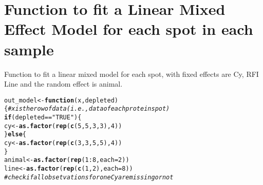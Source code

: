 \documentclass{article}\usepackage[]{graphicx}\usepackage[]{color}
\makeatletter
\newcommand{\hlnum}[1]{\textcolor[rgb]{0.686,0.059,0.569}{#1}}%
\newcommand{\hlstr}[1]{\textcolor[rgb]{0.192,0.494,0.8}{#1}}%
\newcommand{\hlcom}[1]{\textcolor[rgb]{0.678,0.584,0.686}{\textit{#1}}}%
\newcommand{\hlopt}[1]{\textcolor[rgb]{0,0,0}{#1}}%
\newcommand{\hlstd}[1]{\textcolor[rgb]{0.345,0.345,0.345}{#1}}%
\newcommand{\hlkwa}[1]{\textcolor[rgb]{0.161,0.373,0.58}{\textbf{#1}}}%
\newcommand{\hlkwb}[1]{\textcolor[rgb]{0.69,0.353,0.396}{#1}}%
\newcommand{\hlkwc}[1]{\textcolor[rgb]{0.333,0.667,0.333}{#1}}%
\newcommand{\hlkwd}[1]{\textcolor[rgb]{0.737,0.353,0.396}{\textbf{#1}}}%
\newenvironment{kframe}{%
 \def\at@end@of@kframe{}%
 \ifinner\ifhmode%
  \def\at@end@of@kframe{\end{minipage}}%
  \begin{minipage}{\columnwidth}%
 \fi\fi%
 \def\FrameCommand##1{\hskip\@totalleftmargin \hskip-\fboxsep
 \colorbox{shadecolor}{##1}\hskip-\fboxsep
     \hskip-\linewidth \hskip-\@totalleftmargin \hskip\columnwidth}%
 \MakeFramed {\advance\hsize-\width
   \@totalleftmargin\z@ \linewidth\hsize
   \@setminipage}}%
 {\par\unskip\endMakeFramed%
 \at@end@of@kframe}
\newenvironment{knitrout}{}{} %
\makeatother
\begin{document}
\section{Function to fit a Linear Mixed Effect Model for each spot in each sample }
Function to fit a linear mixed model for each spot, with fixed effects are Cy, RFI Line and the random effect is animal.

\begin{knitrout}
\color{fgcolor}\begin{kframe}
\begin{alltt}
\hlstd{out_model} \hlkwb{<-} \hlkwa{function}\hlstd{(}\hlkwc{x}\hlstd{,} \hlkwc{depleted}\hlstd{)\{} \hlcom{# x is the row of data (i.e., data of each protein spot)}
  \hlkwa{if} \hlstd{(depleted} \hlopt{==} \hlstr{"TRUE"}\hlstd{)\{}
    \hlstd{cy} \hlkwb{<-} \hlkwd{as.factor}\hlstd{(}\hlkwd{rep}\hlstd{(}\hlkwd{c}\hlstd{(}\hlnum{5}\hlstd{,}\hlnum{5}\hlstd{,}\hlnum{3}\hlstd{,}\hlnum{3}\hlstd{),}\hlnum{4}\hlstd{))}
  \hlstd{\}} \hlkwa{else} \hlstd{\{}
    \hlstd{cy} \hlkwb{<-} \hlkwd{as.factor}\hlstd{(}\hlkwd{rep}\hlstd{(}\hlkwd{c}\hlstd{(}\hlnum{3}\hlstd{,}\hlnum{3}\hlstd{,}\hlnum{5}\hlstd{,}\hlnum{5}\hlstd{),}\hlnum{4}\hlstd{))}
  \hlstd{\}}
  \hlstd{animal} \hlkwb{<-} \hlkwd{as.factor}\hlstd{(}\hlkwd{rep}\hlstd{(}\hlnum{1}\hlopt{:}\hlnum{8}\hlstd{,} \hlkwc{each} \hlstd{=} \hlnum{2}\hlstd{))}
  \hlstd{line} \hlkwb{<-} \hlkwd{as.factor}\hlstd{(}\hlkwd{rep}\hlstd{(}\hlkwd{c}\hlstd{(}\hlnum{1}\hlstd{,}\hlnum{2}\hlstd{),} \hlkwc{each} \hlstd{=} \hlnum{8}\hlstd{))}
  \hlcom{# check if all obsetvations for one Cy are missing or not}


\end{alltt}
\end{kframe}
\end{knitrout}
\end{document}

